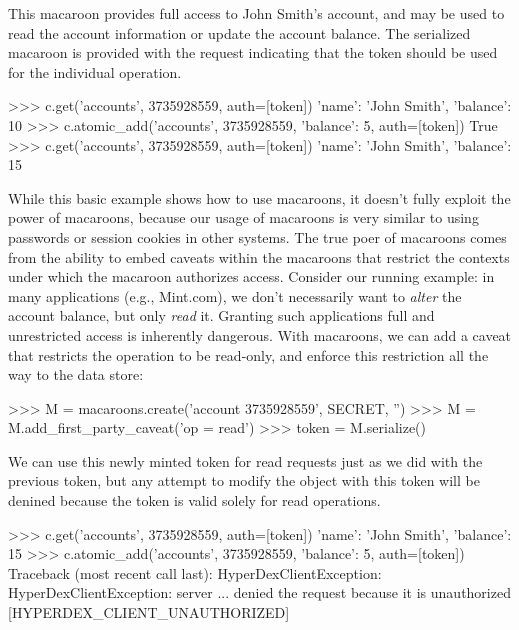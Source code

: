 This macaroon provides full access to John Smith's account, and may be used to
read the account information or update the account balance.  The serialized
macaroon is provided with the request indicating that the token should be used
for the individual operation.

\begin{pythoncode}
>>> c.get('accounts', 3735928559, auth=[token])
{'name': 'John Smith', 'balance': 10}
>>> c.atomic_add('accounts', 3735928559, {'balance': 5}, auth=[token])
True
>>> c.get('accounts', 3735928559, auth=[token])
{'name': 'John Smith', 'balance': 15}
\end{pythoncode}

While this basic example shows how to use macaroons, it doesn't fully exploit
the power of macaroons, because our usage of macaroons is very similar to using
passwords or session cookies in other systems.  The true poer of macaroons comes
from the ability to embed caveats within the macaroons that restrict the
contexts under which the macaroon authorizes access.  Consider our running
example:  in many applications (e.g., Mint.com), we don't necessarily want to
{\em alter} the account balance, but only {\em read} it.  Granting such
applications full and unrestricted access is inherently dangerous.  With
macaroons, we can add a caveat that restricts the operation to be read-only, and
enforce this restriction all the way to the data store:

\begin{pythoncode}
>>> M = macaroons.create('account 3735928559', SECRET, '')
>>> M = M.add_first_party_caveat('op = read')
>>> token = M.serialize()
\end{pythoncode}

We can use this newly minted token for read requests just as we did with the
previous token, but any attempt to modify the object with this token will be
denined because the token is valid solely for read operations.

\begin{pythoncode}
>>> c.get('accounts', 3735928559, auth=[token])
{'name': 'John Smith', 'balance': 15}
>>> c.atomic_add('accounts', 3735928559, {'balance': 5}, auth=[token])
Traceback (most recent call last):
HyperDexClientException: HyperDexClientException: server ... denied the request because it is unauthorized [HYPERDEX_CLIENT_UNAUTHORIZED]
\end{pythoncode}


